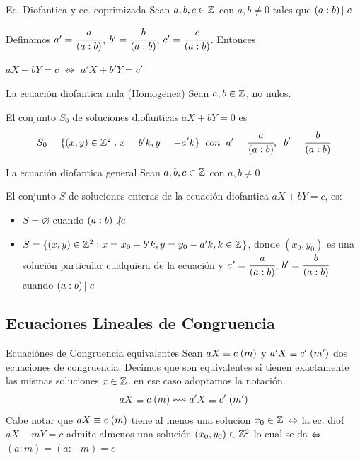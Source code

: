\documentclass[10pt]{article}
\begin{document}
 \begin{obs}{Ec. Diofantica y ec. coprimizada}
   Sean $a,b,c \in \entero{}$ con $a,b \neq 0$ tales que $\divi{(a:b)}{c}$ 
   
   Definamos $a' = \cfrac{a}{(a:b)}$, $b' = \cfrac{b}{(a:b)}$, $c' = \cfrac{c}{(a:b)}$. Entonces
   \begin{center}
   $aX + bY =c$ $\leftrightsquigarrow$ $a'X + b'Y =c'$
  \end{center}
 \end{obs}

\begin{propo}{La ecuación diofantica nula (Homogenea)}
 Sean $a,b \in \entero{}$, no nulos.
 
 El conjunto $S_0$ de soluciones diofanticas $aX + bY =0$ es
 \[S_0 = \{(x,y) \in \entero{2} : x = b'k, y = -a'k\} \es{0.2} con \es{0.2} a' = \cfrac{a}{(a:b)}, \es{0.2} b' = \cfrac{b}{(a:b)}\]
\end{propo}

\begin{teo}{La ecuación diofantica general}
  Sean $a,b,c \in \entero{}$ con $a,b \neq 0$
  
  El conjunto $S$ de soluciones enteras de la ecuación diofantica $aX + bY = c$, es:
  \begin{itemize}
   \item $S = \varnothing$ cuando $(a:b) \not\vert c$
   \item $S = \{(x,y) \in \entero{2} : x = x_0 + b'k, y = y_0 - a'k , k\in \entero{}\}$, donde $(x_0,y_0)$ es una solución particular cualquiera de la ecuación y $a' = \cfrac{a}{(a:b)}$,  $b' = \cfrac{b}{(a:b)}$ cuando $\divi{(a:b)}{c}$
  \end{itemize}
\end{teo}
\begin{center}
\subsection{Ecuaciones Lineales de Congruencia} 
\end{center}

\begin{defi}{Ecuaciónes de Congruencia equivalentes}
 Sean $\congruente{aX}{c}{m}$ y $\congruente{a'X}{c'}{m'}$ dos ecuaciones de congruencia. Decimos que son equivalentes si tienen exactamente las mismas soluciones $x \in \entero{}$. en ese caso adoptamos la notación.
 \[\congruente{aX}{c}{m} \leftrightsquigarrow \congruente{a'X}{c'}{m'}\]
 Cabe notar que $\congruente{aX}{c}{m}$ tiene al menos una solucion $x_0 \in \entero{}$ $\sii$ la ec. diof $aX - mY=c$ admite almenos una solución $(x_0,y_0) \in \entero{2}$ lo cual se da $\sii$ $(a:m)=(a:-m)=c$ 
\end{defi}
\end{document}
